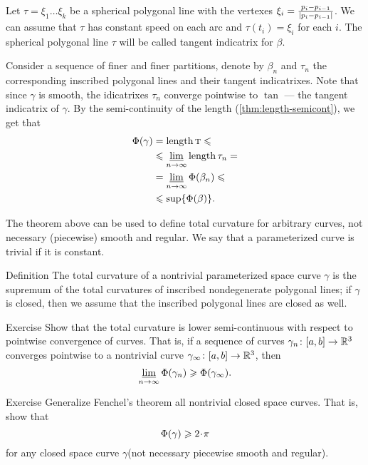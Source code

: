 Let $\tau=\xi_1\dots\xi_k$ be a spherical polygonal line
with the vertexes $\xi_i\z=\tfrac{p_i-p_{i-1}}{|p_i-p_{i-1}|}$.
We can assume that $\tau$ has constant speed on each arc and $\tau(t_i)=\xi_i$ for each $i$. 
The spherical polygonal line $\tau$ will be called tangent indicatrix for $\beta$.

Consider a sequence of finer and finer partitions, denote by $\beta_n$ and $\tau_n$ the corresponding inscribed polygonal lines and their tangent indicatrixes.
Note that since $\gamma$ is smooth, the idicatrixes $\tau_n$ converge pointwise to $\tan$ --- the tangent indicatrix of $\gamma$.
By the semi-continuity of the length (\ref{thm:length-semicont}), we get that  
\begin{align*}
\Phi({\gamma})&=\mathop{\rm length}\nolimits \textsc{t}\leqslant  
\\
&\leqslant \varliminf_{n\to\infty}\mathop{\rm length}\nolimits \tau_n=
\\
&= \varliminf_{n\to\infty}\Phi({\beta_n})\leqslant
\\
&\leqslant \sup\{\Phi({\beta})\}.
\end{align*}
\qeds

The theorem above can be used to define total curvature for arbitrary curves, not necessary (piecewise) smooth and regular. 
We say that a parameterized curve is trivial if it is constant.

\begin{thm}{Definition}\label{def:total-curv-poly}
The total curvature of a nontrivial parameterized space curve $\gamma$ is the supremum of the total curvatures of inscribed nondegenerate polygonal lines;
if $\gamma$ is closed, then we assume that the inscribed polygonal lines are closed as well.
\end{thm}

\begin{thm}{Exercise}\label{ex:tc-semicontinuous}
Show that the total curvature is lower semi-continuous with respect to pointwise convergence of curves.
That is, if a sequence
of curves $\gamma_n\colon[a,b]\to \mathbb{R}^3$ converges pointwise 
to a nontrivial curve $\gamma_\infty\:[a,b]\z\to \RR^3$, then 
\[\varliminf_{n\to\infty} \Phi({\gamma_n}) \geqslant \Phi({\gamma_\infty}).\]
\end{thm}

\begin{thm}{Exercise}
Generalize Fenchel's theorem all nontrivial closed space curves.
That is, show that \[\tc\gamma\ge2\cdot\pi\]
for any  closed space curve $\gamma$(not necessary piecewise smooth and regular).
\end{thm}

